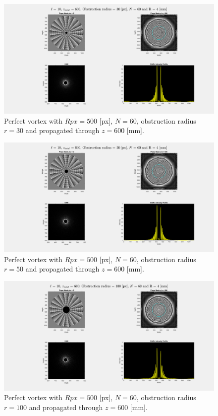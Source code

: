 \begin{figure}[htbp]
    \centering
    \includegraphics[width=12cm]{images/Appendices/Additional_Results/Rpx500_N60/type=1_r=30_zi=0_zf=600.png}
    \caption{Perfect vortex with $Rpx = 500$ [px], $N=60$, obstruction radius $r=30$ and propagated through $z = 600$ [mm].}
    \label{fig:new_perfect_r=30}
\end{figure}

\begin{figure}[htbp]
    \centering
    \includegraphics[width=12cm]{images/Appendices/Additional_Results/Rpx500_N60/type=1_r=50_zi=0_zf=600.png}
    \caption{Perfect vortex with $Rpx = 500$ [px], $N=60$, obstruction radius $r=50$ and propagated through $z = 600$ [mm].}
    \label{fig:new_perfect_r=50}
\end{figure}

\begin{figure}[htbp]
    \centering
    \includegraphics[width=12cm]{images/Appendices/Additional_Results/Rpx500_N60/type=1_r=100_zi=0_zf=600.png}
    \caption{Perfect vortex with $Rpx = 500$ [px], $N=60$, obstruction radius $r=100$ and propagated through $z = 600$ [mm].}
    \label{fig:new_perfect_r=100}
\end{figure}


